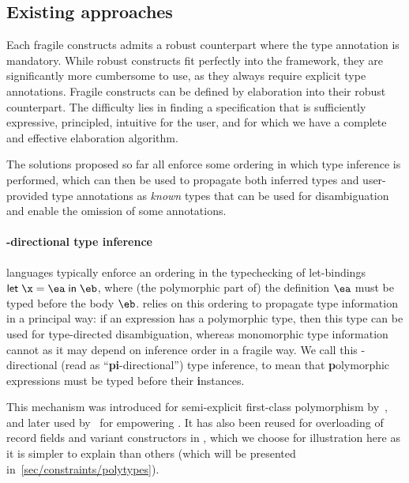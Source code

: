 \documentclass[acmsmall,screen,nonacm,review]{acmart}
\begin{document}
\subsection{Existing approaches}

Each fragile constructs admits
a robust counterpart where the type annotation is mandatory. While
robust constructs fit perfectly into the \ML framework, they are
significantly more cumbersome to use, as they always require explicit type
annotations. Fragile constructs can be defined by elaboration into their
robust counterpart.
%
%
The difficulty lies in finding a specification
that is sufficiently expressive, principled, intuitive for the user,
and for which we have a complete and effective elaboration algorithm.

The solutions proposed so far all enforce some ordering in which type
inference is performed, which can then be used to propagate both inferred
types and user-provided type annotations as \emph{known} types that can be
used for disambiguation and enable the omission of some annotations.


\paragraph{\Geninst-directional type inference}

\ML languages typically enforce an ordering in the typechecking of let-bindings
$\elet \x \ea \eb$, where (the polymorphic part of) the definition
$\ea$ must be typed before the body $\eb$. \OCaml relies on this
ordering to propagate type information in a principal way: if an
expression has a polymorphic type, then this type can be used for
type-directed disambiguation, whereas monomorphic type information
cannot as it may depend on inference order in a fragile way. We call this
\textbf{\geninst}-directional (read as ``\textbf{pi}-directional'')
type inference, to mean that \textbf{p}olymorphic expressions must be
typed before their \textbf{i}nstances.

This mechanism was introduced for semi-explicit first-class
polymorphism by~\citet {Garrigue-Remy/poly-ml}, and later used
by~\citet {LeBotlan-Remy/recasting-mlf} for empowering \MLF. It has
also been reused for overloading of record fields and variant
constructors in \OCaml, which we choose for illustration here as it is
simpler to explain than others (which will be
 presented in~\cref{sec/constraints/polytypes}).
\end{document}
